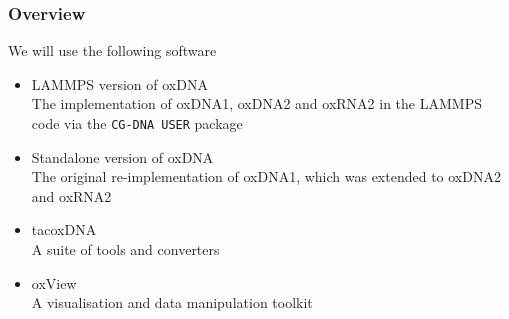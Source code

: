 \documentclass[slidestop,compress,9pt]{beamer}
\begin{document}
\begin{frame}
\frametitle{Overview}

We will use the following software\\[10pt]

\begin{itemize}
\setlength\itemsep{10pt}
\item LAMMPS version of oxDNA\\
The implementation of oxDNA1, oxDNA2 and oxRNA2 in the LAMMPS code via the \texttt{CG-DNA USER} package 
\item Standalone version of oxDNA\\
The original re-implementation of oxDNA1, which was extended to oxDNA2 and oxRNA2
\item tacoxDNA\\
A suite of tools and converters
\item oxView\\
A visualisation and data manipulation toolkit
\end{itemize}

\end{frame}
\end{document}
